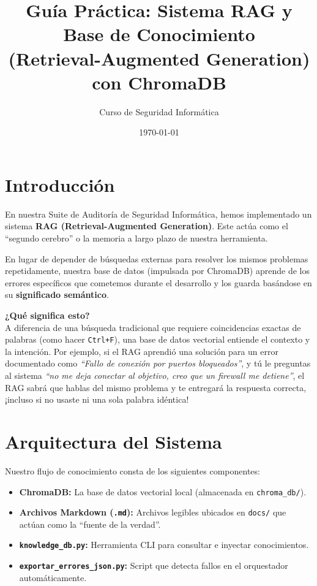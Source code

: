 \documentclass[12pt,a4paper]{article}
\title{\textbf{Guía Práctica: Sistema RAG y Base de Conocimiento}\\ \large (Retrieval-Augmented Generation) con ChromaDB}
\author{Curso de Seguridad Informática}
\date{\today}
\begin{document}
\maketitle

\section{Introducción}
En nuestra Suite de Auditoría de Seguridad Informática, hemos implementado un sistema \textbf{RAG (Retrieval-Augmented Generation)}. Este actúa como el ``segundo cerebro'' o la memoria a largo plazo de nuestra herramienta. 

En lugar de depender de búsquedas externas para resolver los mismos problemas repetidamente, nuestra base de datos (impulsada por ChromaDB) aprende de los errores específicos que cometemos durante el desarrollo y los guarda basándose en su \textbf{significado semántico}.

\textbf{¿Qué significa esto?} \\
A diferencia de una búsqueda tradicional que requiere coincidencias exactas de palabras (como hacer \texttt{Ctrl+F}), una base de datos vectorial entiende el contexto y la intención. Por ejemplo, si el RAG aprendió una solución para un error documentado como \textit{``Fallo de conexión por puertos bloqueados''}, y tú le preguntas al sistema \textit{``no me deja conectar al objetivo, creo que un firewall me detiene''}, el RAG sabrá que hablas del mismo problema y te entregará la respuesta correcta, ¡incluso si no usaste ni una sola palabra idéntica!

\section{Arquitectura del Sistema}
Nuestro flujo de conocimiento consta de los siguientes componentes:
\begin{itemize}
    \item \textbf{ChromaDB:} La base de datos vectorial local (almacenada en \texttt{chroma\_db/}).
    \item \textbf{Archivos Markdown (\texttt{.md}):} Archivos legibles ubicados en \texttt{docs/} que actúan como la ``fuente de la verdad''.
    \item \textbf{\texttt{knowledge\_db.py}:} Herramienta CLI para consultar e inyectar conocimientos.
    \item \textbf{\texttt{exportar\_errores\_json.py}:} Script que detecta fallos en el orquestador automáticamente.
\end{itemize}
\end{document}
